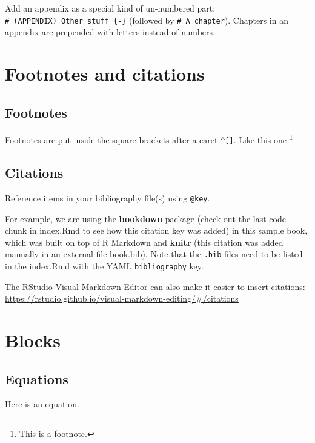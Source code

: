 \documentclass[
]{book}
\theoremstyle{definition}
\theoremstyle{definition}
\theoremstyle{definition}
\theoremstyle{definition}
\theoremstyle{remark}
\begin{document}
Add an appendix as a special kind of un-numbered part: \texttt{\#\ (APPENDIX)\ Other\ stuff\ \{-\}} (followed by \texttt{\#\ A\ chapter}). Chapters in an appendix are prepended with letters instead of numbers.

\hypertarget{footnotes-and-citations}{%
\chapter{Footnotes and citations}\label{footnotes-and-citations}}

\hypertarget{footnotes}{%
\section{Footnotes}\label{footnotes}}

Footnotes are put inside the square brackets after a caret \texttt{\^{}{[}{]}}. Like this one \footnote{This is a footnote.}.

\hypertarget{citations}{%
\section{Citations}\label{citations}}

Reference items in your bibliography file(s) using \texttt{@key}.

For example, we are using the \textbf{bookdown} package \citep{R-bookdown} (check out the last code chunk in index.Rmd to see how this citation key was added) in this sample book, which was built on top of R Markdown and \textbf{knitr} \citep{xie2015} (this citation was added manually in an external file book.bib).
Note that the \texttt{.bib} files need to be listed in the index.Rmd with the YAML \texttt{bibliography} key.

The RStudio Visual Markdown Editor can also make it easier to insert citations: \url{https://rstudio.github.io/visual-markdown-editing/\#/citations}

\hypertarget{blocks}{%
\chapter{Blocks}\label{blocks}}

\hypertarget{equations}{%
\section{Equations}\label{equations}}

Here is an equation.
\end{document}
